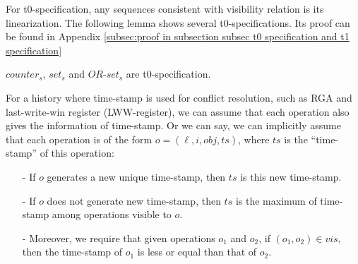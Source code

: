 For t0-specification, any sequences consistent with visibility relation is its linearization. The following lemma shows several t0-specifications. Its proof can be found in Appendix \ref{subsec:proof in subsection subsec t0 specification and t1 specification}

\begin{lemma}
\label{lemma:several t0-specifications}
$\mathit{counter}_s$, $\mathit{set}_s$ and $\mathit{OR}$-$\mathit{set}_s$ are t0-specification. 




\end{lemma}

For a history where time-stamp is used for conflict resolution, such as RGA and last-write-win register (LWW-register), we can assume that each operation also gives the information of time-stamp. Or we can say, we can implicitly assume that each operation is of the form $o = (\ell,i,\mathit{obj},\mathit{ts})$, where $\mathit{ts}$ is the ``time-stamp'' of this operation: %

\begin{itemize}
\setlength{\itemsep}{0.5pt}
\item[-] If $o$ generates a new unique time-stamp, then $\mathit{ts}$ is this new time-stamp.

\item[-] If $o$ does not generate new time-stamp, then $\mathit{ts}$ is the maximum of time-stamp among operations visible to $o$.

\item[-] Moreover, we require that given operations $o_1$ and $o_2$, if $(o_1,o_2) \in \mathit{vis}$, then the time-stamp of $o_1$ is less or equal than that of $o_2$.
\end{itemize}


